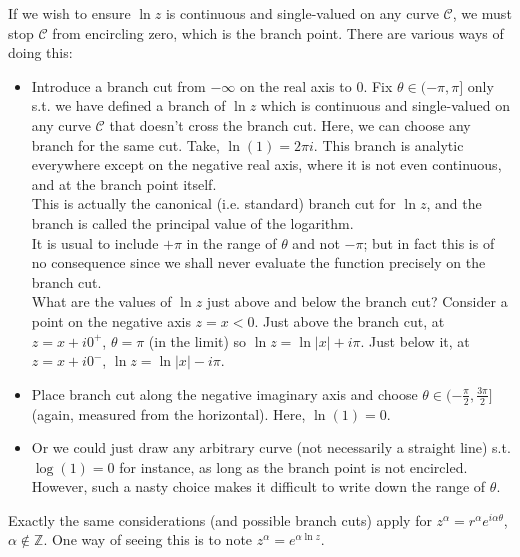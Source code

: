 \documentclass[a4paper]{article}
\begin{document}
\begin{eg}
If we wish to ensure $\ln z$ is continuous and single-valued on any curve $\mathcal{C}$, we must stop $\mathcal{C}$ from encircling zero, which is the branch point. There are various ways of doing this:
\begin{center}
\end{center}
\begin{itemize}
    \item Introduce a branch cut from $-\infty$ on the real axis to 0. Fix $\theta\in(-\pi,\pi]$ only s.t. we have defined a branch of $\ln z$ which is continuous and single-valued on any curve $\mathcal{C}$ that doesn't cross the branch cut. Here, we can choose any branch for the same cut. Take,  $\ln(1)=2\pi i$. This branch is analytic everywhere except on the negative real axis, where it is not even continuous, and at the branch point itself.\\[5pt]
    This is actually the canonical (i.e. standard) branch cut for $\ln z$, and the branch is called the principal value of the logarithm.\\[5pt]
    It is usual to include $+\pi$ in the range of $\theta$ and not $-\pi$; but in fact this is of no consequence since we shall never evaluate the function precisely on the branch cut.\\[5pt]
    What are the values of $\ln z$ just above and below the branch cut? Consider a point on the negative axis $z=x<0$. Just above the branch cut, at $z=x+i0^+$, $\theta=\pi$ (in the limit) so $\ln z=\ln|x|+i\pi$. Just below it, at $z=x+i0^-$, $\ln z=\ln|x|-i\pi$.
    \item Place branch cut along the negative imaginary axis and choose $\theta\in(-\frac{\pi}{2},\frac{3\pi}{2}]$ (again, measured from the horizontal). Here, $\ln(1)=0$.
    \item Or we could just draw any arbitrary curve (not necessarily a straight line) s.t. $\log(1)=0$ for instance, as long as the branch point is not encircled. However, such a nasty choice makes it difficult to write down the range of $\theta$.
\end{itemize}
Exactly the same considerations (and possible branch cuts) apply for $z^\alpha=r^\alpha e^{i\alpha\theta}$, $\alpha\notin\mathbb{Z}$. One way of seeing this is to note $z^\alpha=e^{\alpha\ln z}$.
\end{eg}
\end{document}
